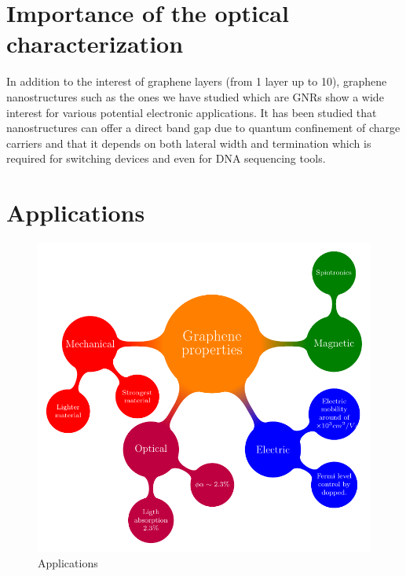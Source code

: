 \section{Importance of the optical characterization}
\vspace{-1cm}
In addition to the interest of graphene layers (from 1 layer up to 10), graphene nanostructures such as the ones we have studied which are GNRs show a wide interest for various potential electronic applications. It has been studied that nanostructures can offer a direct band gap due to quantum confinement of charge carriers and that it depends on both lateral width and termination which is required for switching devices and even for DNA sequencing tools. 



\section{Applications}

\begin{figure}[H]
	\centering
	\includegraphics[width=\textwidth]{FIGURES/Physical_Background/image07.pdf}
	\caption{Applications}
	\label{fig:introfig32}
\end{figure}